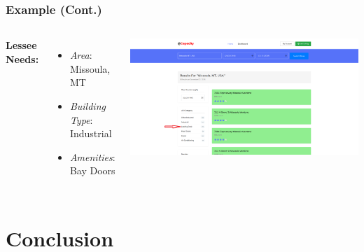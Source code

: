 \documentclass{beamer}
\begin{document}
\begin{frame}
\frametitle{Example (Cont.)}
\begin{columns}[c]
\textbf{Lessee Needs: } 
\begin{itemize}
\item\textit{Area}: Missoula, MT
\item\textit{Building Type}: Industrial
\item\textit{Amenities}: Bay Doors
\end{itemize}
\includegraphics[width=1\textwidth]{loading.png}
\end{columns}
\end{frame}



\section{Conclusion}
\end{document}
